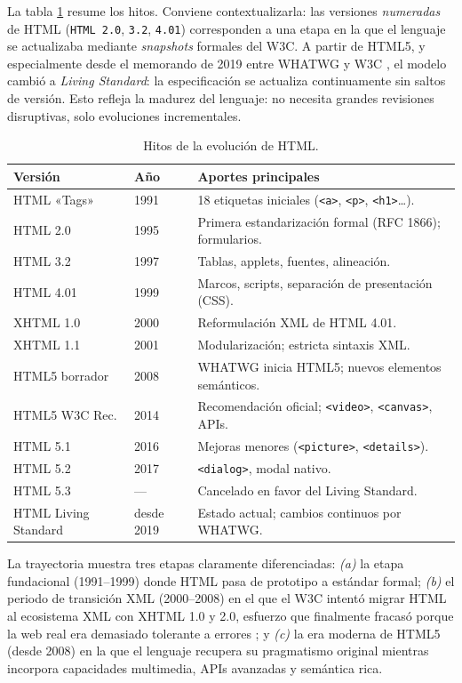 La tabla \ref{tab:evolucion-html} resume los hitos. Conviene
contextualizarla: las versiones \emph{numeradas} de HTML
(\texttt{HTML 2.0}, \texttt{3.2}, \texttt{4.01}) corresponden a una
etapa en la que el lenguaje se actualizaba mediante \emph{snapshots}
formales del W3C. A partir de HTML5, y especialmente desde el
memorando de 2019 entre WHATWG y W3C
\cite{whatwgw3c2019memorandum}, el modelo cambió a \emph{Living
Standard}: la especificación se actualiza continuamente sin saltos
de versión. Esto refleja la madurez del lenguaje: no necesita grandes
revisiones disruptivas, solo evoluciones incrementales.

\begin{table}[!htb]
\centering
\caption{Hitos de la evolución de HTML.}
\label{tab:evolucion-html}
\footnotesize
\begin{tabularx}{\textwidth}{lll}
\toprule
\textbf{Versión} & \textbf{Año} & \textbf{Aportes principales}\\
\midrule
HTML «Tags» & 1991 & 18 etiquetas iniciales (\texttt{<a>}, \texttt{<p>}, \texttt{<h1>}\dots).\\
HTML 2.0 & 1995 & Primera estandarización formal (RFC 1866); formularios.\\
HTML 3.2 & 1997 & Tablas, applets, fuentes, alineación.\\
HTML 4.01 & 1999 & Marcos, scripts, separación de presentación (CSS).\\
XHTML 1.0 & 2000 & Reformulación XML de HTML 4.01.\\
XHTML 1.1 & 2001 & Modularización; estricta sintaxis XML.\\
HTML5 borrador & 2008 & WHATWG inicia HTML5; nuevos elementos semánticos.\\
HTML5 W3C Rec. & 2014 & Recomendación oficial; \texttt{<video>}, \texttt{<canvas>}, APIs.\\
HTML 5.1 & 2016 & Mejoras menores (\texttt{<picture>}, \texttt{<details>}).\\
HTML 5.2 & 2017 & \texttt{<dialog>}, modal nativo.\\
HTML 5.3 & --- & Cancelado en favor del Living Standard.\\
HTML Living Standard & desde 2019 & Estado actual; cambios continuos por WHATWG.\\
\bottomrule
\end{tabularx}
\end{table}

La trayectoria muestra tres etapas claramente diferenciadas:
\emph{(a)} la etapa fundacional (1991--1999) donde HTML pasa de
prototipo a estándar formal; \emph{(b)} el periodo de transición
XML (2000--2008) en el que el W3C intentó migrar HTML al ecosistema
XML con XHTML 1.0 y 2.0, esfuerzo que finalmente fracasó porque la
web real era demasiado tolerante a errores
\cite{hickson2014html5}; y \emph{(c)} la era moderna de HTML5 (desde
2008) en la que el lenguaje recupera su pragmatismo original mientras
incorpora capacidades multimedia, APIs avanzadas y semántica rica.

